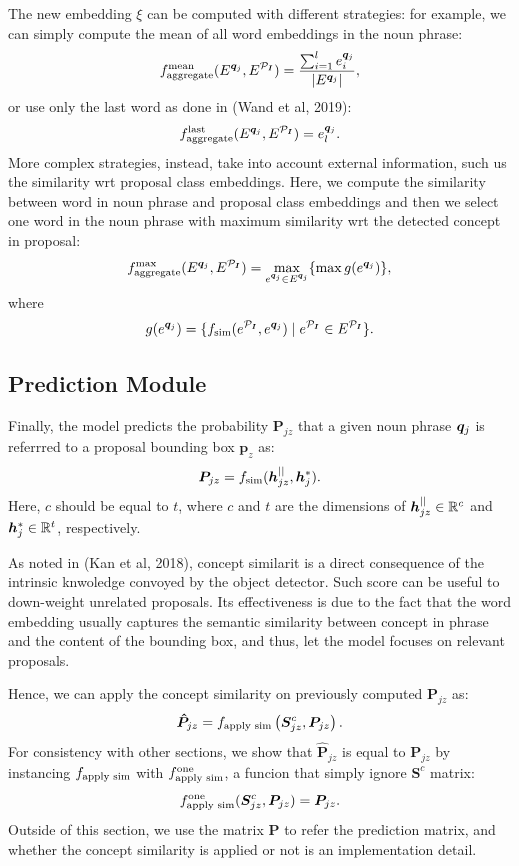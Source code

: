 \documentclass{article}
\begin{document}
The new embedding $\xi$ can be computed with different strategies: for
example, we can simply compute the mean of all word embeddings in the
noun phrase:
\begin{equation}
  f_{\text{aggregate}}^{\text{mean}}(E^{\bm{q}_j}, E^{\mathcal{P}_{\bm{I}}}) = \frac{\sum^l_{i=1} e^{\bm{q}_j}_i}{| E^{\bm{q}_j} |},
\end{equation}
or use only the last word as done in (Wand et al, 2019):
\begin{equation}
  f_{\text{aggregate}}^{\text{last}}(E^{\bm{q}_j}, E^{\mathcal{P}_{\bm{I}}}) = e^{\bm{q}_j}_l.
\end{equation}
More complex strategies, instead, take into account external
information, such us the similarity wrt proposal class embeddings.
Here, we compute the similarity between word in noun phrase and
proposal class embeddings and then we select one word in the noun
phrase with maximum similarity wrt the detected concept in proposal:
\begin{equation}
  f_{\text{aggregate}}^{\text{max}}(E^{\bm{q}_j}, E^{\mathcal{P}_{\bm{I}}}) = \max_{e^{\bm{q}_j} \in E^{\bm{q}_j}} \{ \max g(e^{\bm{q}_j}) \},
\end{equation}
where
\begin{equation}
  g(e^{\bm{q}_j}) = \{ f_{\text{sim}}(e^{\mathcal{P}_{\bm{I}}}, e^{\bm{q}_j}) \mid e^{\mathcal{P}_{\bm{I}}} \in E^{\mathcal{P}_{\bm{I}}} \}.
\end{equation}

\subsection{Prediction Module}

Finally, the model predicts the probability $\bm{P}_{jz}$ that a given
noun phrase $\bm{q}_j$ is referrred to a proposal bounding box $\bm{p}_z$
as:
\begin{equation}
  \bm{P}_{jz} = f_{\text{sim}} ( \bm{h}^{||}_{jz} , \bm{h}^*_j ).
\end{equation}
Here, $c$ should be equal to $t$, where $c$ and $t$ are the dimensions
of $\bm{h}^{||}_{jz} \in \mathbb{R}^c$ and $\bm{h}^*_j \in \mathbb{R}^t$,
respectively.

As noted in (Kan et al, 2018), concept similarit is a direct
consequence of the intrinsic knwoledge convoyed by the object
detector. Such score can be useful to down-weight unrelated proposals.
Its effectiveness is due to the fact that the word embedding usually
captures the semantic similarity between concept in phrase and the
content of the bounding box, and thus, let the model focuses on
relevant proposals.


Hence, we can apply the concept similarity on previously computed
$\bm{P}_{jz}$ as:
\begin{equation}
  \bm{\hat{P}}_{jz} = f_{\text{apply sim}} \left( \bm{S}^c_{jz}, \bm{P}_{jz} \right).
\end{equation}
For consistency with other sections, we show that $\bm{\hat{P}}_{jz}$
is equal to $\bm{P}_{jz}$ by instancing $f_{\text{apply sim}}$ with
$f_{\text{apply sim}}^{\text{one}}$, a funcion that simply ignore $\bm{S}^c$
matrix:
\begin{equation}
  f_{\text{apply sim}}^{\text{one}} (\bm{S}^c_{jz}, \bm{P}_{jz}) = \bm{P}_{jz}.
\end{equation}
Outside of this section, we use the matrix $\bm{P}$ to refer the
prediction matrix, and whether the concept similarity is applied or
not is an implementation detail.
\end{document}
